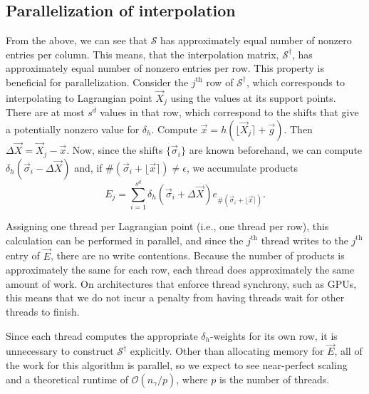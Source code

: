 \subsection{Parallelization of interpolation}

From the above, we can see that $\mathcal{S}$ has approximately equal number
of nonzero entries per column. This means, that the interpolation matrix,
$\mathcal{S}^\dagger$, has approximately equal number of nonzero entries per row.
This property is beneficial for parallelization. Consider the $j^\text{th}$ row of
$\mathcal{S}^\dagger$, which corresponds to interpolating to Lagrangian point
$\vec{X}_j$ using the values at its support points. There are at most $s^d$
values in that row, which correspond to the shifts that give a potentially
nonzero value for $\delta_h$. Compute $\vec{x} = h(\lfloor\vec{X}_j\rceil+\vec{g})$.
Then $\Delta\vec{X} = \vec{X}_j-\vec{x}$. Now, since the shifts $\{\vec{\sigma}_i\}$
are known beforehand, we can compute $\delta_h(\vec{\sigma}_i-\Delta\vec{X})$
and, if $\#(\vec{\sigma}_i+\lfloor\vec{x}\rceil) \neq\epsilon$, we accumulate
products
\begin{equation*}
    E_j = \sum_{i=1}^{s^d}\delta_h(\vec{\sigma}_i+\Delta\vec{X})e_{\#(\vec{\sigma}_i+\lfloor\vec{x}\rceil)}.
\end{equation*}

Assigning one thread per Lagrangian point (i.e., one thread per row), this
calculation can be performed in parallel, and since the $j^\text{th}$ thread writes
to the $j^\text{th}$ entry of $\vec{E}$, there are no write contentions. Because the
number of products is approximately the same for each row, each thread does
approximately the same amount of work. On architectures that enforce thread
synchrony, such as GPUs, this means that we do not incur a penalty from having
threads wait for other threads to finish.

Since each thread computes the appropriate $\delta_h$-weights for its own row,
it is unnecessary to construct $\mathcal{S}^\dagger$ explicitly. Other than
allocating memory for $\vec{E}$, all of the work for this algorithm is parallel,
so we expect to see near-perfect scaling and a theoretical runtime of
$\mathcal{O}(n_\gamma/p)$, where $p$ is the number of threads.
